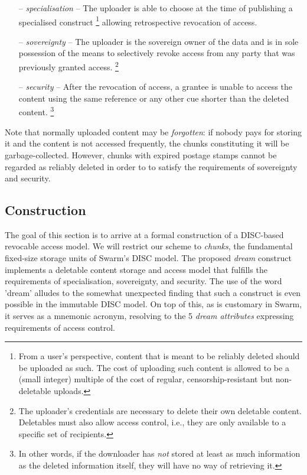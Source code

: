 \begin{itemize}[noitemsep]
    \item[--] \emph{specialisation} -- The uploader is able to choose at the time of publishing a specialised construct%
%
\footnote{From a user's perspective, content that is meant to be reliably deleted should be uploaded as such. The cost of uploading such content is allowed to be a (small integer) multiple of the cost of regular, censorship-resistant but non-deletable uploads.}
%
    allowing retrospective revocation of access.
    \item[--] \emph{sovereignty} -- The uploader is the sovereign owner of the data and is in sole possession of the means to selectively revoke access from any party that was previously granted access.%
%
\footnote{The uploader's credentials are necessary to delete their own deletable content. Deletables must also allow access control, i.e., they are only available to a specific set of recipients.}
%
    \item[--] \emph{security} -- After the revocation of access, a grantee is unable to access the content using the same reference or any other cue shorter than the deleted content.%
%
\footnote{In other words, if the downloader has \emph{not} stored at least as much information as the deleted information itself, they will have no way of retrieving it.}
%
\end{itemize}

Note that normally uploaded content may be \emph{forgotten}: if nobody pays for storing it and the content is not accessed frequently, the chunks constituting it will be garbage-collected. However, chunks with expired postage stamps cannot be regarded as reliably deleted in order to to satisfy the requirements of sovereignty and security. 


\subsection{Construction}

The goal of this section is to arrive at a formal construction of a DISC-based revocable access model. We will restrict our scheme to \emph{chunks}, the fundamental fixed-size storage units of Swarm's DISC model.  The proposed \emph{dream} construct implements a deletable content storage and access model that fulfills the requirements of specialisation, sovereignty, and security. The use of the word 'dream' alludes to the somewhat unexpected finding that such a construct is even possible in the immutable DISC model. On top of this, as is customary in Swarm, it serves as a mnemonic acronym, resolving to the 5 \emph{dream attributes} expressing requirements of access control.

